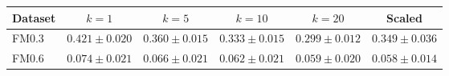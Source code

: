 \begin{tabular}{lccccc}
\toprule
Dataset & $k=1$ & $k=5$ & $k=10$ & $k=20$ & Scaled\\
\midrule
FM0.3 & $0.421\pm0.020$ & $0.360\pm0.015$ & $0.333\pm0.015$ & $0.299\pm0.012$ & $0.349\pm0.036$\\
FM0.6 & $0.074\pm0.021$ & $0.066\pm0.021$ & $0.062\pm0.021$ & $0.059\pm0.020$ & $0.058\pm0.014$\\
\bottomrule
\end{tabular}
